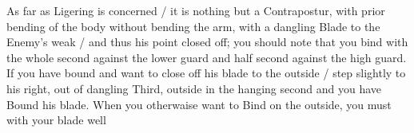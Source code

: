 As far as Ligering is concerned / it is nothing but a Contrapostur,
with prior bending of the body without
bending the
arm, with a dangling Blade to the Enemy's weak / and thus his point
closed off; you should note that you bind with the whole second
against the lower guard and half second against the high guard. If you
have bound and want to close off his blade to the outside / step
slightly to his right, out of dangling Third, outside in the hanging
second and you have Bound his blade. When you otherwaise want to
Bind on the outside, you must with your blade well